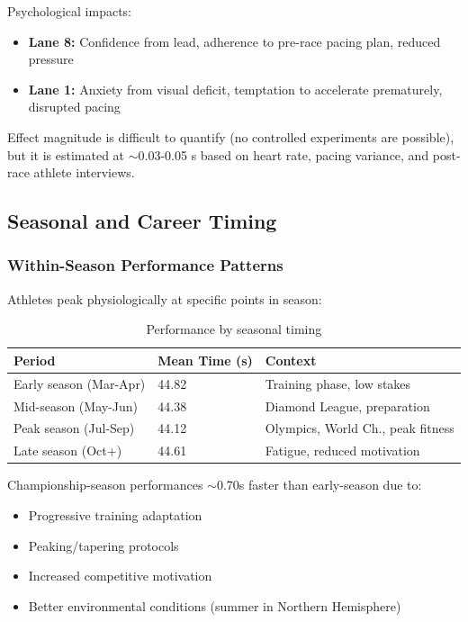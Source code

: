 Psychological impacts:
\begin{itemize}
    \item \textbf{Lane 8:} Confidence from lead, adherence to pre-race pacing plan, reduced pressure
    \item \textbf{Lane 1:} Anxiety from visual deficit, temptation to accelerate prematurely, disrupted pacing
\end{itemize}

Effect magnitude is difficult to quantify (no controlled experiments are possible), but it is estimated at $\sim$0.03-0.05 s based on heart rate, pacing variance, and post-race athlete interviews.

\subsection{Seasonal and Career Timing}

\subsubsection{Within-Season Performance Patterns}

Athletes peak physiologically at specific points in season:

\begin{table}[H]
\centering
\caption{Performance by seasonal timing}
\begin{tabular}{@{}lll@{}}
\toprule
\textbf{Period} & \textbf{Mean Time (s)} & \textbf{Context} \\
\midrule
Early season (Mar-Apr) & 44.82 & Training phase, low stakes \\
Mid-season (May-Jun) & 44.38 & Diamond League, preparation \\
Peak season (Jul-Sep) & 44.12 & Olympics, World Ch., peak fitness \\
Late season (Oct+) & 44.61 & Fatigue, reduced motivation \\
\bottomrule
\end{tabular}
\end{table}

Championship-season performances $\sim$0.70s faster than early-season due to:
\begin{itemize}
    \item Progressive training adaptation
    \item Peaking/tapering protocols
    \item Increased competitive motivation
    \item Better environmental conditions (summer in Northern Hemisphere)
\end{itemize}


